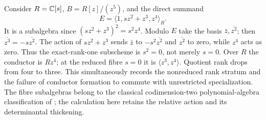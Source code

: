 \begin{remark}\label{ex:conductor-rank-jump}
Consider $R=\mathbb C[s]$, $B=R[z]/(z^5)$, and the direct summand
\[
 E=\langle1,sz^2+z^3,z^4\rangle_R.
\]
It is a subalgebra since $(sz^2+z^3)^2=s^2z^4$. Modulo $E$ take the
basis $\bar z,\overline{z^2}$; then $\overline{z^3}=-s\overline{z^2}$.
The action of $sz^2+z^3$ sends $\bar z$ to $-s^2\overline{z^2}$ and
$\overline{z^2}$ to zero, while $z^4$ acts as zero. Thus the
exact-rank-one subscheme is \emph{$s^2=0$}, not merely $s=0$.
Over $R$ the conductor is $Rz^4$; at the reduced fibre $s=0$ it is
$\langle z^3,z^4\rangle$. Quotient rank drops from four to three.
This simultaneously records the nonreduced rank stratum and the failure
of conductor formation to commute with unrestricted specialization.
The fibre subalgebras belong to the classical codimension-two
polynomial-algebra classification of \cite[Theorem 39]{GLTU}; the
calculation here retains the relative action and its determinantal
thickening.
\end{remark}
